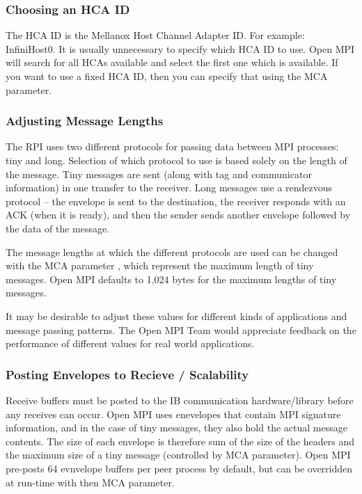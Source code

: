 
\subsubsection{Choosing an HCA ID}

The HCA ID is the Mellanox Host Channel Adapter ID.  For example:
InfiniHost0.  It is usually unnecessary to specify which HCA ID to
use.  Open MPI will search for all HCAs available and select the first
one which is available.  If you want to use a fixed HCA ID, then you
can specify that using the  MCA
parameter.


\subsubsection{Adjusting Message Lengths}

The  RPI uses two different protocols for passing data between
MPI processes: tiny and long.  Selection of which protocol to use is
based solely on the length of the message.  Tiny messages are sent
(along with tag and communicator information) in one transfer to the
receiver.  Long messages use a rendezvous protocol -- the envelope is
sent to the destination, the receiver responds with an ACK (when it is
ready), and then the sender sends another envelope followed by the
data of the message.

The message lengths at which the different protocols are used can be
changed with the MCA parameter  ,
which represent the maximum length of tiny messages.  Open MPI defaults to
1,024 bytes for the maximum lengths of tiny messages.

It may be desirable to adjust these values for different kinds of
applications and message passing patterns.  The Open MPI Team would
appreciate feedback on the performance of different values for real
world applications.


\subsubsection{Posting Envelopes to Recieve / Scalability}
\label{sec:mca-ompi-ib-envelopes}

Receive buffers must be posted to the IB communication
hardware/library before any receives can occur.  Open MPI uses
enevelopes that contain MPI signature information, and in the case of
tiny messages, they also hold the actual message contents.
%
The size of each envelope is therefore sum of the size of the headers
and the maximum size of a tiny message (controlled by
 MCA parameter).  Open MPI pre-posts 64
evnvelope buffers per peer process by default, but can be overridden
at run-time with then  MCA
parameter.

